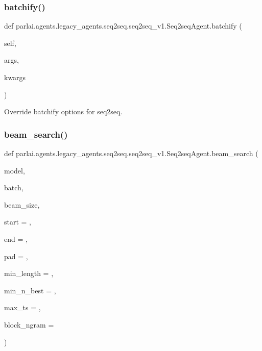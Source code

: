 \subsubsection{\texorpdfstring{batchify()}{batchify()}}
{\footnotesize\ttfamily def parlai.\+agents.\+legacy\+\_\+agents.\+seq2seq.\+seq2seq\+\_\+v1.\+Seq2seq\+Agent.\+batchify (\begin{DoxyParamCaption}\item[{}]{self,  }\item[{}]{args,  }\item[{}]{kwargs }\end{DoxyParamCaption})}

\begin{DoxyVerb}Override batchify options for seq2seq.
\end{DoxyVerb}
 \mbox{\label{classparlai_1_1agents_1_1legacy__agents_1_1seq2seq_1_1seq2seq__v1_1_1Seq2seqAgent_a58227903fd44e3d436710c06457c8f84}} 
\subsubsection{\texorpdfstring{beam\+\_\+search()}{beam\_search()}}
{\footnotesize\ttfamily def parlai.\+agents.\+legacy\+\_\+agents.\+seq2seq.\+seq2seq\+\_\+v1.\+Seq2seq\+Agent.\+beam\+\_\+search (\begin{DoxyParamCaption}\item[{}]{model,  }\item[{}]{batch,  }\item[{}]{beam\+\_\+size,  }\item[{}]{start = {},  }\item[{}]{end = {},  }\item[{}]{pad = {},  }\item[{}]{min\+\_\+length = {},  }\item[{}]{min\+\_\+n\+\_\+best = {},  }\item[{}]{max\+\_\+ts = {},  }\item[{}]{block\+\_\+ngram = {} }\end{DoxyParamCaption})\hspace{0.3cm}{\ttfamily [static]}}

